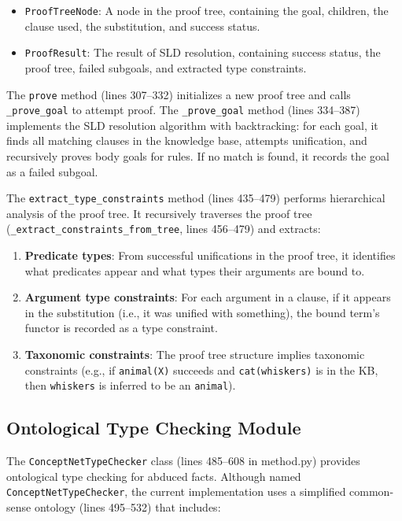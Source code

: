 \documentclass[11pt,letterpaper]{article}
\begin{document}
\begin{itemize}
  \item \texttt{ProofTreeNode}: A node in the proof tree, containing the goal, children, the clause used, the substitution, and success status.
  \item \texttt{ProofResult}: The result of SLD resolution, containing success status, the proof tree, failed subgoals, and extracted type constraints.
\end{itemize}

The \texttt{prove} method (lines 307--332) initializes a new proof tree and calls \texttt{\_prove\_goal} to attempt proof. The \texttt{\_prove\_goal} method (lines 334--387) implements the SLD resolution algorithm with backtracking: for each goal, it finds all matching clauses in the knowledge base, attempts unification, and recursively proves body goals for rules. If no match is found, it records the goal as a failed subgoal.

The \texttt{extract\_type\_constraints} method (lines 435--479) performs hierarchical analysis of the proof tree. It recursively traverses the proof tree (\texttt{\_extract\_constraints\_from\_tree}, lines 456--479) and extracts:

\begin{enumerate}
  \item \textbf{Predicate types}: From successful unifications in the proof tree, it identifies what predicates appear and what types their arguments are bound to.
  \item \textbf{Argument type constraints}: For each argument in a clause, if it appears in the substitution (i.e., it was unified with something), the bound term's functor is recorded as a type constraint.
  \item \textbf{Taxonomic constraints}: The proof tree structure implies taxonomic constraints (e.g., if \texttt{animal(X)} succeeds and \texttt{cat(whiskers)} is in the KB, then \texttt{whiskers} is inferred to be an \texttt{animal}).
\end{enumerate}

\subsection{Ontological Type Checking Module}

The \texttt{ConceptNetTypeChecker} class (lines 485--608 in method.py) provides ontological type checking for abduced facts. Although named \texttt{ConceptNetTypeChecker}, the current implementation uses a simplified common-sense ontology (lines 495--532) that includes:
\end{document}
